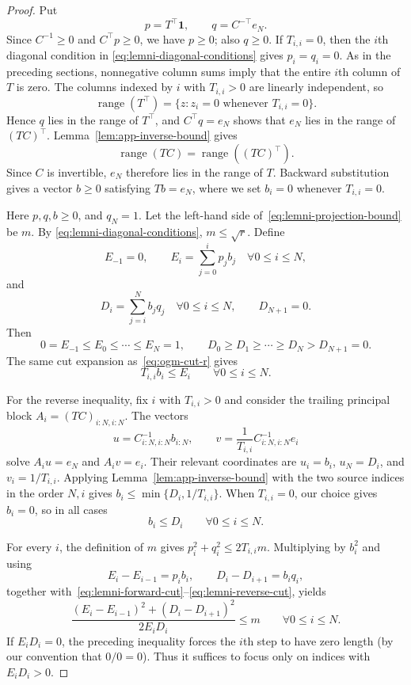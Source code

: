 \documentclass[11pt]{article}
\begin{document}
\begin{proof}
Put
\[
    p=T^\top\mathbf1,
    \qquad
    q=C^{-\top}e_N.
\]
Since $C^{-1}\geq0$ and $C^\top p\geq0$, we have $p\geq0$; also $q\geq0$.
If $T_{i,i}=0$, then the $i$th diagonal condition in
\eqref{eq:lemni-diagonal-conditions} gives $p_i=q_i=0$. As in the preceding
sections, nonnegative column sums imply that the entire $i$th column of $T$ is
zero. The columns indexed by $i$ with $T_{i,i}>0$ are linearly independent, so
\[
    \operatorname{range}(T^\top)
    =\{z:z_i=0\text{ whenever }T_{i,i}=0\}.
\]
Hence $q$ lies in the range of $T^\top$, and $C^\top q=e_N$ shows that
$e_N$ lies in the range of $(TC)^\top$. Lemma~\ref{lem:app-inverse-bound}
gives
\[
\operatorname{range}(TC)=\operatorname{range}((TC)^\top).
\]
Since $C$ is invertible, $e_N$ therefore lies in the range of $T$.
Backward substitution gives a vector $b\geq0$ satisfying $Tb=e_N$, where we
set $b_i=0$ whenever $T_{i,i}=0$.

Here $p,q,b\geq0$, and $q_N=1$. Let the left-hand side
of~\eqref{eq:lemni-projection-bound} be $m$. By
\eqref{eq:lemni-diagonal-conditions}, $m\leq\sqrt r$. Define
\[
    E_{-1}=0,
    \qquad
    E_i=\sum_{j=0}^i p_jb_j
    \quad \forall 0\leq i\leq N,
\]
and
\[
    D_i=\sum_{j=i}^N b_jq_j
    \quad \forall 0\leq i\leq N,
    \qquad
    D_{N+1}=0.
\]
Then
\[
    0=E_{-1}\leq E_0\leq\cdots\leq E_N=1,
    \qquad
    D_0\geq D_1\geq\cdots\geq D_N>D_{N+1}=0.
\]
The same cut expansion as~\eqref{eq:ogm-cut-r} gives
\begin{equation}\label{eq:lemni-forward-cut}
    T_{i,i}b_i\leq E_i
    \qquad \forall 0\leq i\leq N.
\end{equation}

For the reverse inequality, fix $i$ with $T_{i,i}>0$ and consider
the trailing principal block $A_i=(TC)_{i:N,i:N}$. The vectors
\[
u=C_{i:N,i:N}^{-1}b_{i:N},
\qquad
v=\frac1{T_{i,i}}C_{i:N,i:N}^{-1}e_i
\]
solve $A_iu=e_N$ and $A_iv=e_i$. Their relevant coordinates are
$u_i=b_i$, $u_N=D_i$, and $v_i=1/T_{i,i}$.
Applying Lemma~\ref{lem:app-inverse-bound} with the two source indices in the
order $N,i$ gives
$b_i\leq\min\{D_i,1/T_{i,i}\}$. When
$T_{i,i}=0$, our choice gives $b_i=0$, so in all cases
\begin{equation}\label{eq:lemni-reverse-cut}
    b_i\leq D_i
    \qquad \forall 0\leq i\leq N.
\end{equation}

For every $i$, the definition of $m$ gives $p_i^2+q_i^2\leq2T_{i,i}m$.
Multiplying by $b_i^2$ and using
\[
    E_i-E_{i-1}=p_ib_i,
    \qquad
    D_i-D_{i+1}=b_iq_i,
\]
together with~\eqref{eq:lemni-forward-cut}--\eqref{eq:lemni-reverse-cut},
yields
\begin{equation}\label{eq:lemni-path-inequality}
    \frac{(E_i-E_{i-1})^2+(D_i-D_{i+1})^2}
    {2E_iD_i}
    \leq m
    \qquad \forall 0\leq i\leq N.
\end{equation}
If $E_iD_i=0$, the preceding inequality forces the $i$th
step to have zero length (by our convention that $0/0=0$). Thus it suffices to focus only on indices with $E_iD_i>0$.


\end{proof}
\end{document}

